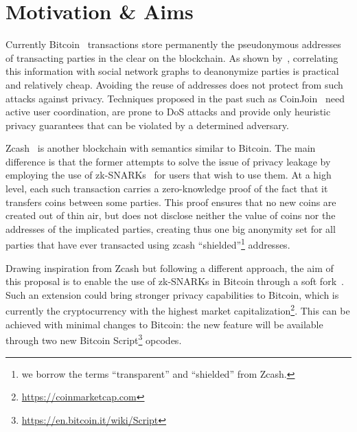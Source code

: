 \section{Motivation \& Aims}
  Currently Bitcoin~\cite{bitcoin} transactions store permanently the
  pseudonymous addresses of transacting parties in the clear on the blockchain.
  As shown by~\cite{DBLP:conf/fc/AndroulakiKRSC13}, correlating this
  information with social network graphs to deanonymize parties is practical and
  relatively cheap.  Avoiding the reuse of addresses does not protect from such
  attacks against privacy.  Techniques proposed in the past such as
  CoinJoin~\cite{DBLP:conf/trustcom/MaurerNF17} need active user coordination,
  are prone to DoS attacks and provide only heuristic privacy guarantees that
  can be violated by a determined adversary.

  Zcash~\cite{DBLP:conf/sp/Ben-SassonCG0MTV14,zcash-protocol} is another
  blockchain with semantics similar to Bitcoin. The main difference is that the
  former attempts to solve the issue of privacy leakage by employing the use of
  zk-SNARKs~\cite{DBLP:conf/stoc/BitanskyCCT13,DBLP:conf/eurocrypt/Groth16} for
  users that wish to use them. At a high level, each such transaction carries a
  zero-knowledge proof of the fact that it transfers coins between some parties.
  This proof ensures that no new coins are created out of thin air, but does not
  disclose neither the value of coins nor the addresses of the implicated
  parties, creating thus one big anonymity set for all parties that have ever
  transacted using zcash ``shielded''\footnote{we borrow the terms
  ``transparent'' and ``shielded'' from Zcash.} addresses.

  Drawing inspiration from Zcash but following a different approach, the aim of
  this proposal is to enable the use of zk-SNARKs in Bitcoin through a soft
  fork~\cite{DBLP:conf/fc/ZamyatinSJSWK18}. Such an extension could bring
  stronger privacy capabilities to Bitcoin, which is currently the
  cryptocurrency with the highest market
  capitalization\footnote{\url{https://coinmarketcap.com}}. This can be achieved
  with minimal changes to Bitcoin: the new feature will be available through two
  new Bitcoin Script\footnote{\url{https://en.bitcoin.it/wiki/Script}} opcodes.
